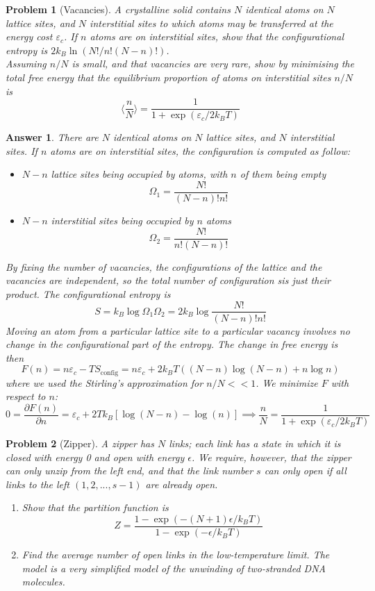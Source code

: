 \documentclass[a4paper]{article}
\newtheorem{ans}{Answer}[section]
\theoremstyle{new}
\newtheorem{qns}{Problem}[section]
\begin{document}
\begin{qns}[Vacancies]
A crystalline solid contains $N$ identical atoms on $N$ lattice sites, and $N$ interstitial sites to which atoms may be transferred at the energy cost $\varepsilon_c$. If $n$ atoms are on interstitial sites, show that the configurational entropy is $2k_B\ln(N!/n!(N −n)!)$.\\[5pt]
Assuming $n/N$ is small, and that vacancies are very rare, show by minimising the total free energy that the equilibrium proportion of atoms on interstitial sites $n/N$ is
$$\bigg\langle\frac{n}{N}\bigg\rangle=\frac{1}{1+\exp(\varepsilon_c/2k_BT)}$$
\end{qns}
\begin{ans}
There are $N$ identical atoms on $N$ lattice sites, and $N$ interstitial sites. If $n$ atoms are on interstitial sites, the configuration is computed as follow:
\begin{itemize}
    \item $N-n$ lattice sites being occupied by atoms, with $n$ of them being empty
    $$\Omega_1=\frac{N!}{(N-n)!n!}$$
    \item $N-n$ interstitial sites being occupied by $n$ atoms
    $$\Omega_2=\frac{N!}{n!(N-n)!}$$
\end{itemize}
By fixing the number of vacancies, the configurations of the lattice and the vacancies are independent, so the total number of configuration sis just their product. The configurational entropy is
$$S=k_B\log\Omega_1\Omega_2=2k_B\log\frac{N!}{(N-n)!n!}$$
Moving an atom from a particular lattice site to a particular vacancy involves no change in the configurational part of the entropy. The change in free energy is then
$$F(n)=n\varepsilon_c-TS_{\text{config}}=n\varepsilon_c+2k_BT((N-n)\log(N-n)+n\log n)$$
where we used the Stirling's approximation for $n/N<<1$. We minimize $F$ with respect to $n$:
$$0=\frac{\partial F(n)}{\partial n}=\varepsilon_c+2Tk_B[\log(N-n)-\log(n)]\implies\frac{n}{N}=\frac{1}{1+\exp(\varepsilon_c/2k_BT)}$$
\end{ans}
\begin{qns}[Zipper]
A zipper has $N$ links; each link has a state in which it is closed with energy 0 and open with energy $\epsilon$. We require, however, that the zipper can only unzip from the left end, and that the link number $s$ can only open if all links to the left $(1,2,...,s−1)$ are already open. 
\begin{enumerate}[label=(\alph*)]
\item Show that the partition function is
$$Z=\frac{1-\exp(-(N+1)\epsilon/k_BT)}{1-\exp(-\epsilon/k_BT)}$$
\item Find the average number of open links in the low-temperature limit. The model is a very simplified model of the unwinding of two-stranded DNA molecules.
\end{enumerate}
\end{qns}
\end{document}
